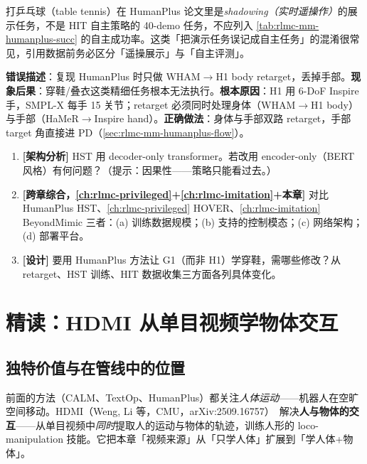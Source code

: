 \begin{note}
打乒乓球（table tennis）在 HumanPlus 论文里是\emph{shadowing（实时遥操作）}的展示任务，不是 HIT 自主策略的 40-demo 任务，不应列入 \cref{tab:rlmc-mm-humanplus-succ} 的自主成功率。这类「把演示任务误记成自主任务」的混淆很常见，引用数据前务必区分「遥操展示」与「自主评测」。
\end{note}

\begin{pitfall}
\textbf{错误描述}：复现 HumanPlus 时只做 WHAM$\to$H1 body retarget，丢掉手部。\textbf{现象后果}：穿鞋/叠衣这类精细任务根本无法执行。\textbf{根本原因}：H1 用 6-DoF Inspire 手，SMPL-X 每手 15 关节；retarget 必须同时处理身体（WHAM$\to$H1 body）与手部（HaMeR$\to$Inspire hand）。\textbf{正确做法}：身体与手部双路 retarget，手部 target 角直接进 PD（\cref{sec:rlmc-mm-humanplus-flow}）。
\end{pitfall}

\begin{practice}[练习·HumanPlus]
\begin{enumerate}
  \item \textbf{[架构分析]} HST 用 decoder-only transformer。若改用 encoder-only（BERT 风格）有何问题？（提示：因果性——策略只能看过去。）
  \item \textbf{[跨章综合，\cref{ch:rlmc-privileged}+\cref{ch:rlmc-imitation}+本章]} 对比 HumanPlus HST、\cref{ch:rlmc-privileged} HOVER、\cref{ch:rlmc-imitation} BeyondMimic 三者：(a) 训练数据规模；(b) 支持的控制模态；(c) 网络架构；(d) 部署平台。
  \item \textbf{[设计]} 要用 HumanPlus 方法让 G1（而非 H1）学穿鞋，需哪些修改？从 retarget、HST 训练、HIT 数据收集三方面各列具体变化。
\end{enumerate}
\end{practice}

\section{精读：HDMI 从单目视频学物体交互}
\label{sec:rlmc-mm-hdmi}

\subsection{独特价值与在管线中的位置}
\label{sec:rlmc-mm-hdmi-pos}

前面的方法（CALM、TextOp、HumanPlus）都关注\emph{人体运动}——机器人在空旷空间移动。HDMI（Weng, Li 等，CMU，arXiv:2509.16757）\,\cite{weng2025hdmi} 解决\textbf{人与物体的交互}——从单目视频中\emph{同时}提取人的运动与物体的轨迹，训练人形的 loco-manipulation 技能。它把本章「视频来源」从「只学人体」扩展到「学人体+物体」。

